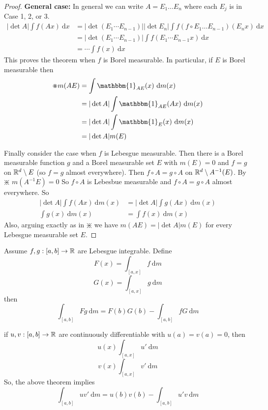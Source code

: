 \begin{proof}
  \textbf{General case:} In general we can write $A = E_1\dotsc E_n$ where each $E_j$ is in Case 1, 2, or 3.
  \begin{align*}
    |\det A| \int f(Ax) \ \mathrm{d}x &= |\det (E_1 \dotsm E_{n-1})||\det E_n| \int f(f\circ E_1\dotsc E_{n-1})(E_n x) \ \mathrm{d}x  \\
    &= |\det (E_1 \dotsm E_{n-1})| \int f(E_1 \dotsm E_{n-1} x) \ \mathrm{d}x \\
    &= \dotsm \int f(x)\ \mathrm{d}x
  \end{align*}
  This proves the theorem when $f$ is Borel measurable. In particular, if $E$ is Borel measurable then
  \begin{align*}
    \divideontimes m(AE) &= \int \mathbbm{1}_{AE}(x) \ \mathrm{d}m(x)  \\
    &= |\det A| \int \mathbbm{1}_{AE}(Ax) \ \mathrm{d}m(x) \\
    &= |\det A| \int \mathbbm{1}_E(x) \ \mathrm{d}m(x) \\
    &= |\det A| m(E)
  \end{align*}

  Finally consider the case when $f$ is Lebesgue measurable.
  Then there is a Borel measurable function $g$ and a Borel measurable set $E$ with $m(E) = 0$
  and $f = g$ on $\mathbb R^d \setminus E$ (so $f = g$ almost everywhere).
  Then $f \circ A = g\circ A$ on $\mathbb R^d \setminus A^{-1}(E)$. By $\divideontimes$ $m(A^{-1}E) = 0$
  So $f \circ A$ is Lebesbue measurable and $f\circ A = g \circ A$ almost everywhere. So
  \begin{align*}
    |\det A| \int f(Ax) \ \mathrm{d}m(x) &= |\det A| \int g(Ax) \ \mathrm{d}m(x) \\
    \int g(x) \ \mathrm{d}m(x) &= \int f(x) \ \mathrm{d}m(x)
  \end{align*}
  Also, arguing exactly as in $\divideontimes$ we have $m(AE) = |\det A| m(E)$ for every Lebesgue measurable set $E$.
\end{proof}

\begin{theorem}
  Assume $f, g : [a, b] \to \mathbb R$ are Lebesgue integrable. 
  Define
  \[F(x) = \int_{[a, x]} f \ \mathrm{d}m\]
  \[G(x) = \int_{[a, x]} g \ \mathrm{d}m\]
  then 
  \[\int_{[a, b]} Fg \ \mathrm{d}m = F(b)G(b) - \int_{[a, b]} fG \ \mathrm{d}m\]
\end{theorem}
\begin{remark}
  if $u, v: [a, b] \to \mathbb R$ are continuously differentiable with $u(a) = v(a) = 0$, then 
  \[u(x) \int_{[a, x]} u' \ \mathrm{d}m\]
  \[v(x) \int_{[a, x]} v' \ \mathrm{d}m\]
  So, the above theorem implies 
  \[\int_{[a, b]}uv' \ \mathrm{d}m = u(b)v(b) - \int_{[a, b]} u'v \ \mathrm{d}m\]
\end{remark}

